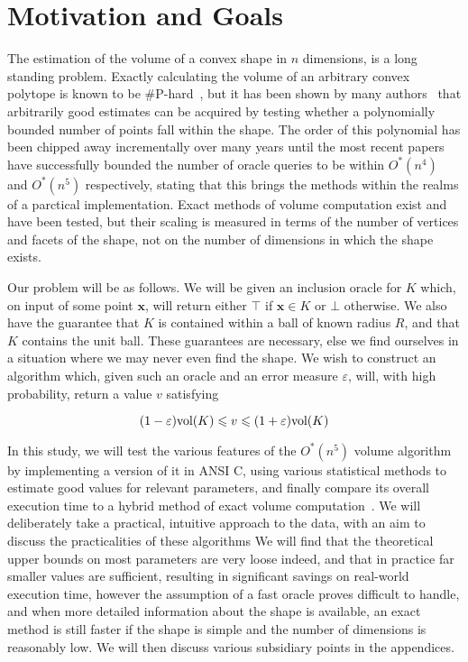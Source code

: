 \section{Motivation and Goals}

The estimation of the volume of a convex shape in $n$ dimensions, is a long standing problem. Exactly calculating the volume of an arbitrary convex polytope is known to be \#P-hard~\cite{Dyer88}, but it has been shown by many authors~\cite{Dyer95, Kannan97, Lovasz03}
that arbitrarily good estimates can be acquired by testing whether a polynomially bounded number of points fall within the shape. The order of this polynomial has been chipped away incrementally over many years until the most recent papers have successfully bounded the number of oracle queries to be within $O^{*}(n^4)$ and $O^{*}(n^5)$ respectively, stating that this brings the methods within the realms of a parctical implementation. Exact methods of volume computation exist and have been tested, but their scaling is measured in terms of the number of vertices and facets of the shape, not on the number of dimensions in which the shape exists. 

Our problem will be as follows. We will be given an inclusion oracle for $K$ which, on input of some point $\bm{x}$, will return either $\top$ if $\bm{x} \in K$ or $\bot$ otherwise. We also have the guarantee that $K$ is contained within a ball of known radius $R$, and that $K$ contains the unit ball. These guarantees are necessary, else we find ourselves in a situation where we may never even find the shape. We wish to construct an algorithm which, given such an oracle and an error measure $\varepsilon$, will, with high probability, return a value $v$ satisfying

$$
(1-\varepsilon)\mbox{vol}(K) \leqslant v \leqslant (1+\varepsilon)\mbox{vol}(K)
$$

In this study, we will test the various features of the $O^{*}(n^5)$ volume algorithm~\cite{Kannan97} by implementing a version of it in ANSI C, using various statistical methods to estimate good values for relevant parameters, and finally compare its overall execution time to a hybrid method of exact volume computation~\cite{Bueler98}. We will deliberately take a practical, intuitive approach to the data, with an aim to discuss the practicalities of these algorithms We will find that the theoretical upper bounds on most parameters are very loose indeed, and that in practice far smaller values are sufficient, resulting in significant savings on real-world execution time, however the assumption of a fast oracle proves difficult to handle, and when more detailed information about the shape is available, an exact method is still faster if the shape is simple and the number of dimensions is reasonably low. We will then discuss various subsidiary points in the appendices.

